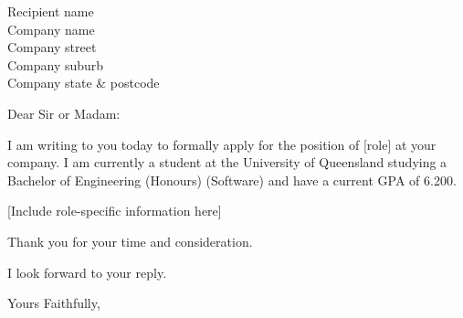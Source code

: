 \documentclass{letter}
\begin{document}
\begin{letter}{Recipient name \\ Company name \\ Company street
\\ Company suburb \\ Company state \& postcode}
\opening{Dear Sir or Madam:}

I am writing to you today to formally apply for the position of [role] at your company. I am currently a student at the University of Queensland studying a Bachelor of Engineering (Honours) (Software) and have a current GPA of 6.200.

[Include role-specific information here]

Thank you for your time and consideration.

I look forward to your reply.

\closing{Yours Faithfully,}

\end{letter}
\end{document}
